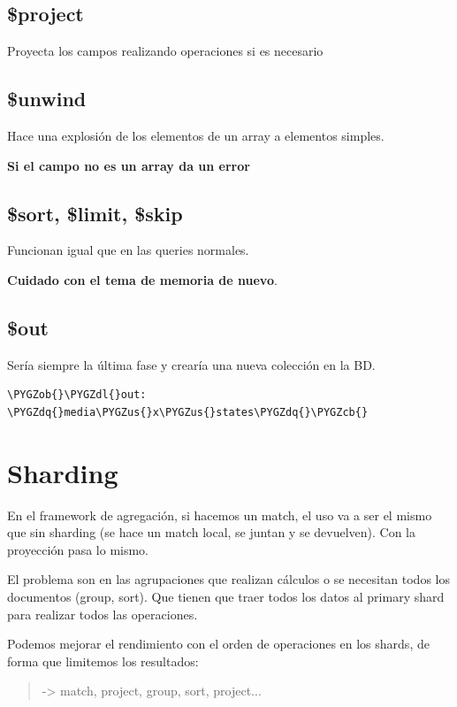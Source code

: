 \documentclass[a4paper,10pt,english]{sphinxmanual}
\def\PYGZus{\char`\_}
\def\PYGZob{\char`\{}
\def\PYGZcb{\char`\}}
\def\PYGZdl{\char`\$}
\def\PYGZdq{\char`\"}
\begin{document}
\subsection{\$project}
\label{contents/aggregationFramework:project}
Proyecta los campos realizando operaciones si es necesario


\subsection{\$unwind}
\label{contents/aggregationFramework:unwind}
Hace una explosión de los elementos de un array a elementos simples.

\textbf{Si el campo no es un array da un error}


\subsection{\$sort, \$limit, \$skip}
\label{contents/aggregationFramework:sort-limit-skip}
Funcionan igual que en las queries normales.

\textbf{Cuidado con el tema de memoria de nuevo}.


\subsection{\$out}
\label{contents/aggregationFramework:out}
Sería siempre la última fase y crearía una nueva colección en la BD.

\begin{Verbatim}[commandchars=\\\{\}]
\PYGZob{}\PYGZdl{}out: \PYGZdq{}media\PYGZus{}x\PYGZus{}states\PYGZdq{}\PYGZcb{}
\end{Verbatim}


\section{Sharding}
\label{contents/aggregationFramework:sharding}
En el framework de agregación, si hacemos un match, el uso va a ser el mismo que sin sharding (se hace un match local, se juntan y se devuelven). Con la proyección pasa lo mismo.

El problema son en las agrupaciones que realizan cálculos o se necesitan todos los documentos (group, sort). Que tienen que traer todos los datos al primary shard para realizar todos las operaciones.

Podemos mejorar el rendimiento con el orden de operaciones en los shards, de forma que limitemos los resultados:
\begin{quote}

-\textgreater{} match, project, group, sort, project...
\end{quote}
\end{document}
